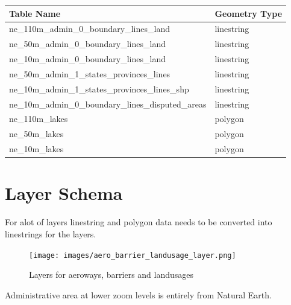 \begin{flushleft}
    \begin{tabular}{ll}
    \hline
    Table Name                                          & Geometry Type \\
    \hline
    ne\_110m\_admin\_0\_boundary\_lines\_land           & linestring    \\
    ne\_50m\_admin\_0\_boundary\_lines\_land            & linestring    \\
    ne\_10m\_admin\_0\_boundary\_lines\_land            & linestring    \\
    ne\_50m\_admin\_1\_states\_provinces\_lines         & linestring    \\
    ne\_10m\_admin\_1\_states\_provinces\_lines\_shp    & linestring    \\
    ne\_10m\_admin\_0\_boundary\_lines\_disputed\_areas & linestring    \\
    ne\_110m\_lakes                                     & polygon       \\
    ne\_50m\_lakes                                      & polygon       \\
    ne\_10m\_lakes                                      & polygon       \\
    \end{tabular}
\end{flushleft}

\newpage
\section{Layer Schema}\label{layer-schema}

For alot of layers linestring and polygon data needs to be converted into
linestrings for the layers.

\begin{figure}[h]
  \centering
  \texttt{[image: images/aero\_barrier\_landusage\_layer.png]}
  \caption{Layers for aeroways, barriers and landusages}
\end{figure}

\newpage
Administrative area at lower zoom levels is entirely from Natural Earth.

